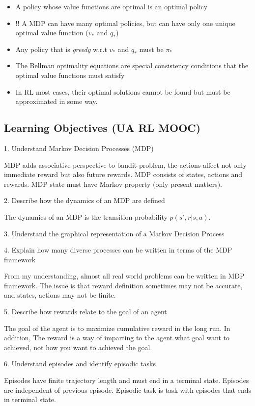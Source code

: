 \documentclass[sutton_barto_notes.tex]{subfiles}
\begin{document}
\begin{itemize}
\item A policy whose value functions are optimal is an optimal policy
\item !! A MDP can have many optimal policies, but can have only one unique optimal value function ($v_*$ and $q_*$)
\item Any policy that is \textit{greedy} w.r.t $v_*$ and $q_*$ must be $\pi_*$
\item The Bellman optimality equations are special consistency conditions that the optimal value functions must satisfy
\item In RL most cases, their optimal solutions cannot be found but must be approximated in some way.
\end{itemize}

\newpage
\subsection{Learning Objectives (UA RL MOOC)}
1. Understand Markov Decision Processes (MDP)

MDP adds associative perspective to bandit problem, the actions affect not only immediate reward but also future rewards.
MDP consists of states, actions and rewards. MDP state must have Markov property (only present matters).

2. Describe how the dynamics of an MDP are defined

The dynamics of an MDP is the transition probability $p(s',r|s,a)$.

3. Understand the graphical representation of a Markov Decision Process

4. Explain how many diverse processes can be written in terms of the MDP framework

From my understanding, almost all real world problems can be written in MDP framework. The issue is that reward definition sometimes may not be accurate, and states, actions may not be finite.

5. Describe how rewards relate to the goal of an agent

The goal of the agent is to maximize cumulative reward in the long run. In addition,
The reward is a way of imparting to the agent what goal want to achieved, not how you want to achieved the goal.

6. Understand episodes and identify episodic tasks

Episodes have finite trajectory length and must end in a terminal state. Episodes are independent of previous episode.
Episodic task is task with episodes that ends in terminal state.
\end{document}
